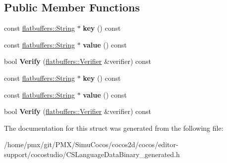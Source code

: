 \subsection*{Public Member Functions}
\begin{DoxyCompactItemize}
\item 
\mbox{\label{structflatbuffers_1_1LanguageItem_a62e7f21f62672c5a9449a48c73798fb8}} 
const \hyperlink{structflatbuffers_1_1String}{flatbuffers\+::\+String} $\ast$ {\bfseries key} () const
\item 
\mbox{\label{structflatbuffers_1_1LanguageItem_aa9df6afcb6892172cabc45a5ec367be2}} 
const \hyperlink{structflatbuffers_1_1String}{flatbuffers\+::\+String} $\ast$ {\bfseries value} () const
\item 
\mbox{\label{structflatbuffers_1_1LanguageItem_a3c0e1e2f5068a7da8d7bd7b7859a4bd5}} 
bool {\bfseries Verify} (\hyperlink{classflatbuffers_1_1Verifier}{flatbuffers\+::\+Verifier} \&verifier) const
\item 
\mbox{\label{structflatbuffers_1_1LanguageItem_a62e7f21f62672c5a9449a48c73798fb8}} 
const \hyperlink{structflatbuffers_1_1String}{flatbuffers\+::\+String} $\ast$ {\bfseries key} () const
\item 
\mbox{\label{structflatbuffers_1_1LanguageItem_aa9df6afcb6892172cabc45a5ec367be2}} 
const \hyperlink{structflatbuffers_1_1String}{flatbuffers\+::\+String} $\ast$ {\bfseries value} () const
\item 
\mbox{\label{structflatbuffers_1_1LanguageItem_a3c0e1e2f5068a7da8d7bd7b7859a4bd5}} 
bool {\bfseries Verify} (\hyperlink{classflatbuffers_1_1Verifier}{flatbuffers\+::\+Verifier} \&verifier) const
\end{DoxyCompactItemize}


The documentation for this struct was generated from the following file\+:\begin{DoxyCompactItemize}
\item 
/home/pmx/git/\+P\+M\+X/\+Simu\+Cocos/cocos2d/cocos/editor-\/support/cocostudio/C\+S\+Language\+Data\+Binary\+\_\+generated.\+h\end{DoxyCompactItemize}
